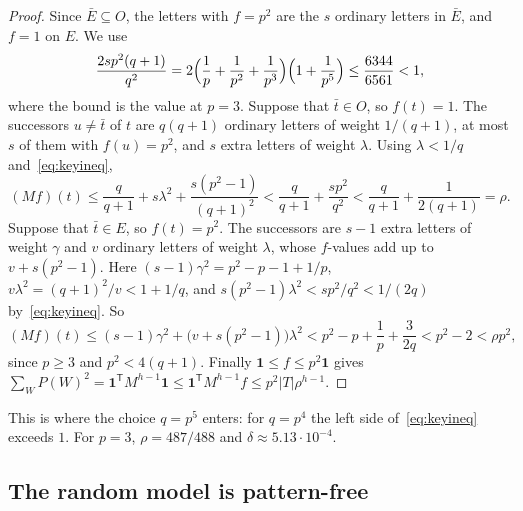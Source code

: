 \documentclass[11pt]{article}
\theoremstyle{definition}
\theoremstyle{plain}
\newcommand{\one}{\mathbf{1}}
\begin{document}
\begin{proof}
Since $\bar E\subseteq O$, the letters with $f=p^2$ are the $s$ ordinary letters in $\bar E$, and $f=1$ on $E$. We use
\begin{equation}\label{eq:keyineq}
\frac{2sp^2(q+1)}{q^2}=2\Bigl(\frac1p+\frac1{p^2}+\frac1{p^3}\Bigr)\Bigl(1+\frac1{p^5}\Bigr)\le\frac{6344}{6561}<1,
\end{equation}
where the bound is the value at $p=3$. Suppose that $\bar t\in O$, so $f(t)=1$. The successors $u\neq\bar t$ of $t$ are $q(q+1)$ ordinary letters of weight $1/(q+1)$, at most $s$ of them with $f(u)=p^2$, and $s$ extra letters of weight $\lambda$. Using $\lambda<1/q$ and~\eqref{eq:keyineq},
\[
(Mf)(t)\le\frac q{q+1}+s\lambda^2+\frac{s(p^2-1)}{(q+1)^2}<\frac q{q+1}+\frac{sp^2}{q^2}<\frac q{q+1}+\frac1{2(q+1)}=\rho.
\]
Suppose that $\bar t\in E$, so $f(t)=p^2$. The successors are $s-1$ extra letters of weight $\gamma$ and $v$ ordinary letters of weight $\lambda$, whose $f$-values add up to $v+s(p^2-1)$. Here $(s-1)\gamma^2=p^2-p-1+1/p$, $v\lambda^2=(q+1)^2/v<1+1/q$, and $s(p^2-1)\lambda^2<sp^2/q^2<1/(2q)$ by~\eqref{eq:keyineq}. So
\[
(Mf)(t)\le(s-1)\gamma^2+\bigl(v+s(p^2-1)\bigr)\lambda^2<p^2-p+\frac1p+\frac3{2q}<p^2-2<\rho p^2,
\]
since $p\ge3$ and $p^2<4(q+1)$. Finally $\one\le f\le p^2\one$ gives $\sum_WP(W)^2=\one^{\mathsf T}M^{h-1}\one\le\one^{\mathsf T}M^{h-1}f\le p^2|T|\rho^{h-1}$.
\end{proof}

This is where the choice $q=p^5$ enters: for $q=p^4$ the left side of~\eqref{eq:keyineq} exceeds $1$. For $p=3$, $\rho=487/488$ and $\delta\approx5.13\cdot10^{-4}$.

\subsection{The random model is pattern-free}\label{sec:oddmodel}
\end{document}
